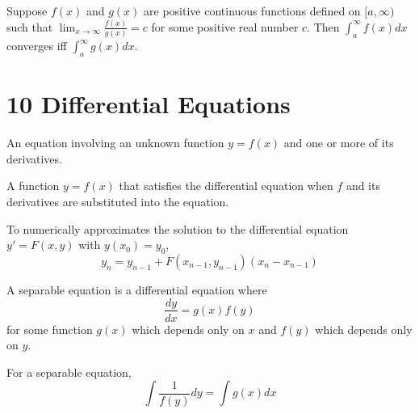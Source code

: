\begin{theorem}
  Suppose $f(x)$ and $g(x)$ are positive continuous functions defined on $[a, \infty)$ such that $\displaystyle \lim_{x \to \infty} \frac{f(x)}{g(x)} = c$ for some positive real number $c$. Then $\int_a^\infty f(x) dx$ converges iff $\int_a^\infty g(x) dx$.
\end{theorem}

\section*{10 Differential Equations}

\begin{definition} An equation involving an unknown function $y = f(x)$ and one or more of its derivatives.
\end{definition}

\begin{definition} A function $y = f(x)$ that satisfies the differential equation when $f$ and its derivatives are substituted into the equation.
\end{definition}

  

\begin{procedure} To numerically approximates the solution to the differential equation $y' = F(x, y)$ with $y(x_0) = y_0$,
  \[
    y_n = y_{n - 1} + F(x_{n-1}, y_{n - 1})(x_n - x_{n - 1})
  \]
\end{procedure}

\begin{definition} A separable equation is a differential equation where
  \[
    \frac{dy}{dx} = g(x)f(y)
  \]
  for some function $g(x)$ which depends only on $x$ and $f(y)$ which depends only on $y$.
\end{definition}

\begin{theorem} For a separable equation,
  \[
    \int \frac{1}{f(y)} dy = \int g(x) dx
  \]
\end{theorem}

